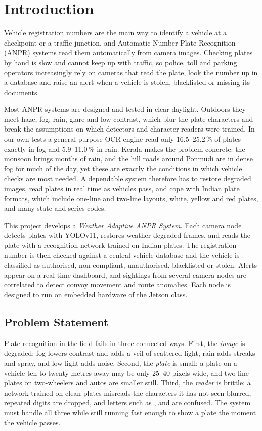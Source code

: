 \chapter{Introduction}
\label{ch:intro}

Vehicle registration numbers are the main way to identify a vehicle at a
checkpoint or a traffic junction, and Automatic Number Plate Recognition (ANPR)
systems read them automatically from camera images. Checking plates by hand is
slow and cannot keep up with traffic, so police, toll and parking operators
increasingly rely on cameras that read the plate, look the number up in a
database and raise an alert when a vehicle is stolen, blacklisted or missing
its documents.

Most ANPR systems are designed and tested in clear daylight. Outdoors they meet
haze, fog, rain, glare and low contrast, which blur the plate characters and
break the assumptions on which detectors and character readers were trained. In
our own tests a general-purpose OCR engine read only 16.5--25.2\,\% of plates
exactly in fog and 5.9--11.0\,\% in rain. Kerala makes the problem concrete:
the monsoon brings months of rain, and the hill roads around Ponmudi are in
dense fog for much of the day, yet these are exactly the conditions in which
vehicle checks are most needed. A dependable system therefore has to restore
degraded images, read plates in real time as vehicles pass, and cope with
Indian plate formats, which include one-line and two-line layouts, white,
yellow and red plates, and many state and series codes.

This project develops a \emph{Weather Adaptive ANPR System}. Each camera node
detects plates with YOLOv11, restores weather-degraded frames, and reads the
plate with a recognition network trained on Indian plates. The registration
number is then checked against a central vehicle database and the vehicle is
classified as authorised, non-compliant, unauthorised, blacklisted or stolen.
Alerts appear on a real-time dashboard, and sightings from several camera nodes
are correlated to detect convoy movement and route anomalies. Each node is
designed to run on embedded hardware of the Jetson class.

\section{Problem Statement}

Plate recognition in the field fails in three connected ways. First, the
\emph{image} is degraded: fog lowers contrast and adds a veil of scattered
light, rain adds streaks and spray, and low light adds noise. Second, the
\emph{plate} is small: a plate on a vehicle ten to twenty metres away may be
only 25--40 pixels wide, and two-line plates on two-wheelers and autos are
smaller still. Third, the \emph{reader} is brittle: a network trained on clean
plates misreads the characters it has not seen blurred, repeated digits are
dropped, and letters such as ,  and  are confused.
The system must handle all three while still running fast enough to show a
plate the moment the vehicle passes.

